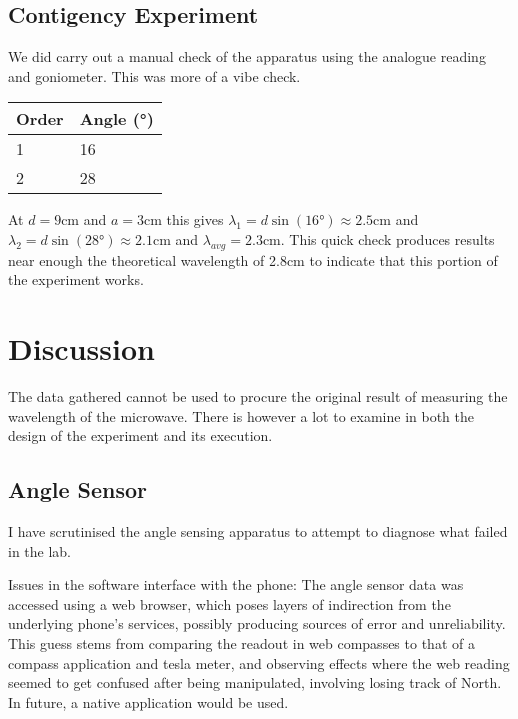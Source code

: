 \subsection*{Contigency Experiment}

We did carry out a manual check of the apparatus using the analogue reading and goniometer.
This was more of a vibe check. 

\begin{table}[h]
\begin{tabular}{|ll|}
\hline
 Order & Angle (°)   \\
\hline
 1  & 16   \\
 2  & 28   \\
\hline
\end{tabular}
\end{table}

At $d = 9$cm and $a = 3$cm this gives $\lambda_1 = d \sin{(16°)} \approx 2.5$cm and $\lambda_2 = d \sin{(28°)} \approx 2.1$cm and $\lambda_{avg} = 2.3$cm. 
This quick check produces results near enough the theoretical wavelength of 2.8cm to indicate that this portion of the experiment works.

\section*{Discussion}

The data gathered cannot be used to procure the original result of measuring the wavelength of the microwave. There is however a lot to examine in both the design of the experiment and its execution.

\subsection*{Angle Sensor}

I have scrutinised the angle sensing apparatus to attempt to diagnose what failed in the lab.

Issues in the software interface with the phone:
The angle sensor data was accessed using a web browser, which poses layers of indirection from the underlying phone's services, possibly producing sources of error and unreliability. This guess stems from comparing the readout in web compasses to that of a compass application and tesla meter, and observing effects where the web reading seemed to get confused after being manipulated, involving losing track of North. In future, a native application would be used.

